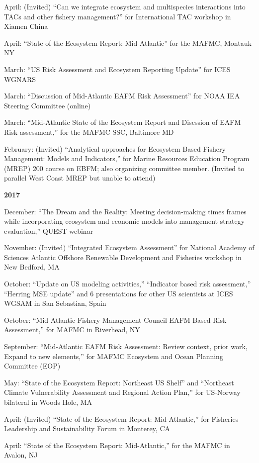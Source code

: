 \documentclass[11pt, a4paper]{awesome-cv}
\begin{document}
April: (Invited) ``Can we integrate ecosystem and multispecies
interactions into TACs and other fishery management?'' for International
TAC workshop in Xiamen China

April: ``State of the Ecosystem Report: Mid-Atlantic'' for the MAFMC,
Montauk NY

March: ``US Risk Assessment and Ecosystem Reporting Update'' for ICES
WGNARS

March: ``Discussion of Mid-Atlantic EAFM Risk Assessment'' for NOAA IEA
Steering Committee (online)

March: ``Mid-Atlantic State of the Ecosystem Report and Discssion of
EAFM Risk assessment,'' for the MAFMC SSC, Baltimore MD

February: (Invited) ``Analytical approaches for Ecosystem Based Fishery
Management: Models and Indicators,'' for Marine Resources Education
Program (MREP) 200 course on EBFM; also organizing committee member.
(Invited to parallel West Coast MREP but unable to attend)

\textbf{2017}

December: ``The Dream and the Reality: Meeting decision-making times
frames while incorporating ecosystem and economic models into management
strategy evaluation,'' QUEST webinar

November: (Invited) ``Integrated Ecosystem Assessment'' for National
Academy of Sciences Atlantic Offshore Renewable Development and
Fisheries workshop in New Bedford, MA

October: ``Update on US modeling activities,'' ``Indicator based risk
assessment,'' ``Herring MSE update'' and 6 presentations for other US
scientists at ICES WGSAM in San Sebastian, Spain

October: ``Mid-Atlantic Fishery Management Council EAFM Based Risk
Assessment,'' for MAFMC in Riverhead, NY

September: ``Mid-Atlantic EAFM Risk Assessment: Review context, prior
work, Expand to new elements,'' for MAFMC Ecosystem and Ocean Planning
Committee (EOP)

May: ``State of the Ecosystem Report: Northeast US Shelf'' and
``Northeast Climate Vulnerability Assessment and Regional Action Plan,''
for US-Norway bilateral in Woods Hole, MA

April: (Invited) ``State of the Ecosystem Report: Mid-Atlantic,'' for
Fisheries Leadership and Sustainability Forum in Monterey, CA

April: ``State of the Ecosystem Report: Mid-Atlantic,'' for the MAFMC in
Avalon, NJ
\end{document}
